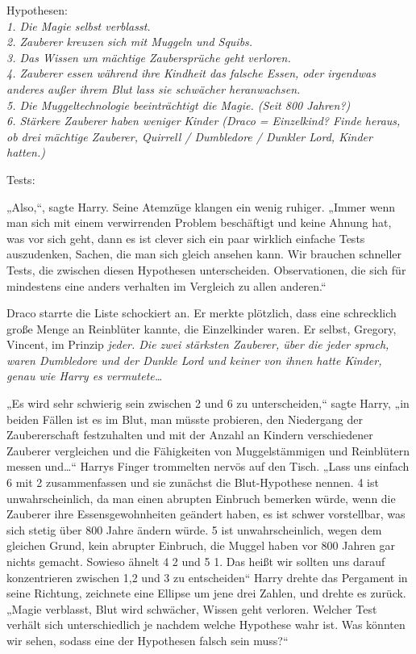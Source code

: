 {Hypothesen:\\ \emph{1\emph{. Die Magie selbst verblasst.}}\\ \emph{2. Zauberer \emph{kreuzen sich mit Muggeln und Squibs.}}\\ \emph{3. Das Wissen um mächtige Zaubersprüche geht verloren.}\\ \emph{4. Zauberer essen während ihre Kindheit das falsche Essen, oder irgendwas anderes außer ihrem Blut lass sie schwächer heranwachsen.}\\ \emph{5. Die Muggeltechnologie beeinträchtigt die Magie. (Seit 800 Jahren?)}\\ \emph{6. Stärkere Zauberer haben weniger Kinder (Draco = Einzelkind? Finde heraus, ob drei mächtige Zauberer, Quirrell / Dumbledore / Dunkler Lord, Kinder hatten.)}

Tests:

„Also,“, sagte Harry. Seine Atemzüge klangen ein wenig ruhiger. „Immer wenn man sich mit einem verwirrenden Problem beschäftigt und keine Ahnung hat, was vor sich geht, dann es ist clever sich ein paar wirklich einfache Tests auszudenken, Sachen, die man sich gleich ansehen kann. Wir brauchen schneller Tests, die zwischen diesen Hypothesen unterscheiden. Observationen, die sich für mindestens eine anders verhalten im Vergleich zu allen anderen.“

Draco starrte die Liste schockiert an. Er merkte plötzlich, dass eine schrecklich große Menge an Reinblüter kannte, die Einzelkinder waren. Er selbst, Gregory, Vincent, im Prinzip \emph{jeder. Die zwei stärksten Zauberer, über die jeder sprach, waren Dumbledore und der Dunkle Lord und keiner von ihnen hatte Kinder, genau wie Harry es vermutete…}

„Es wird sehr schwierig sein zwischen 2 und 6 zu unterscheiden,“ sagte Harry, „in beiden Fällen ist es im Blut, man müsste probieren, den Niedergang der Zaubererschaft festzuhalten und mit der Anzahl an Kindern verschiedener Zauberer vergleichen und die Fähigkeiten von Muggelstämmigen und Reinblütern messen und…“ Harrys Finger trommelten nervös auf den Tisch. „Lass uns einfach 6 mit 2 zusammenfassen und sie zunächst die Blut-Hypothese nennen. 4 ist unwahrscheinlich, da man einen abrupten Einbruch bemerken würde, wenn die Zauberer ihre Essensgewohnheiten geändert haben, es ist schwer vorstellbar, was sich stetig über 800 Jahre ändern würde. 5 ist unwahrscheinlich, wegen dem gleichen Grund, kein abrupter Einbruch, die Muggel haben vor 800 Jahren gar nichts gemacht. Sowieso ähnelt 4 2 und 5 1. Das heißt wir sollten uns darauf konzentrieren zwischen 1,2 und 3 zu entscheiden“ Harry drehte das Pergament in seine Richtung, zeichnete eine Ellipse um jene drei Zahlen, und drehte es zurück. „Magie verblasst, Blut wird schwächer, Wissen geht verloren. Welcher Test verhält sich unterschiedlich je nachdem welche Hypothese wahr ist. Was könnten wir sehen, sodass eine der Hypothesen falsch sein muss?“

}
